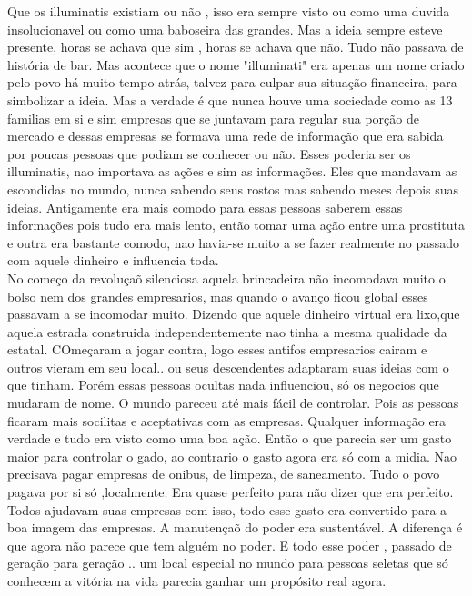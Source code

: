\documentclass{book}
\begin{document}
 Que os illuminatis existiam ou não , isso era sempre visto ou como uma duvida insolucionavel ou como uma baboseira das grandes. Mas a ideia sempre esteve presente, horas se achava que sim , horas se achava que não. Tudo não passava de história de bar. Mas acontece que o nome "illuminati" era apenas um nome criado pelo povo há muito tempo atrás, talvez para culpar sua situação financeira, para simbolizar a ideia. Mas a verdade é que nunca houve uma sociedade como as 13 familias em si e sim empresas que se juntavam para regular sua porção de mercado e dessas empresas se formava uma rede de informação que era sabida por poucas pessoas que podiam se conhecer ou não. Esses poderia ser os illuminatis, nao importava as ações e sim as informações. Eles que mandavam as escondidas no mundo, nunca sabendo seus rostos mas sabendo meses depois suas ideias. Antigamente era mais comodo para essas pessoas saberem essas informações pois tudo era mais lento, então tomar uma ação entre uma prostituta e outra era bastante comodo, nao havia-se muito a se fazer realmente no passado com aquele dinheiro e influencia toda. \\
 
 No começo da revoluçaõ silenciosa aquela brincadeira não incomodava muito o bolso nem dos grandes empresarios, mas quando o avanço ficou global esses passavam a se incomodar muito. Dizendo que aquele dinheiro virtual era lixo,que aquela estrada construida independentemente nao tinha a mesma qualidade da estatal. COmeçaram a jogar contra, logo esses antifos empresarios cairam e outros vieram em seu local.. ou seus descendentes adaptaram suas ideias com o que tinham. Porém essas pessoas ocultas nada influenciou, só os negocios que mudaram de nome. O mundo pareceu até mais fácil de controlar. Pois as pessoas ficaram mais socilitas e aceptativas com as empresas. Qualquer informação era verdade e tudo era visto como uma boa ação. Então o que parecia ser um gasto maior para controlar o gado, ao contrario o gasto agora era só com a midia. Nao precisava pagar empresas de onibus, de limpeza, de saneamento. Tudo o povo pagava por si só ,localmente. Era quase perfeito para não dizer que era perfeito. Todos ajudavam suas empresas com isso, todo esse gasto era convertido para a boa imagem das empresas. A manutençaõ do poder era sustentável. A diferença é que agora não parece que tem alguém no poder. E todo esse poder , passado de geração para geração .. um local especial no mundo para pessoas seletas que só conhecem a vitória na vida parecia ganhar um propósito real agora. \\
 
\end{document}
